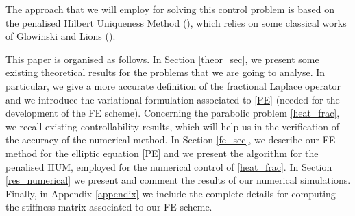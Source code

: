 The approach that we will employ for solving this control problem is based on the penalised Hilbert Uniqueness Method (\cite{boyer2013penalised}), which relies on some classical works of Glowinski and Lions (\cite{glowinski1995exact,glowinski2008exact}).   

This paper is organised as follows. In Section \ref{theor_sec}, we present some existing theoretical results for the problems that we are going to analyse. In particular, we give a more accurate definition of the fractional Laplace operator and we introduce the variational formulation associated to \eqref{PE} (needed for the development of the FE scheme). Concerning the parabolic problem \eqref{heat_frac}, we recall existing controllability results, which will help us in the verification of the accuracy of the numerical method. In Section \ref{fe_sec}, we describe our FE method for the elliptic equation \eqref{PE} and we present the algorithm for the penalised HUM, employed for the numerical control of \eqref{heat_frac}. In Section \ref{res_numerical} we present and comment the results of our numerical simulations. Finally, in Appendix \ref{appendix} we include the complete details for computing the stiffness matrix associated to our FE scheme.  

